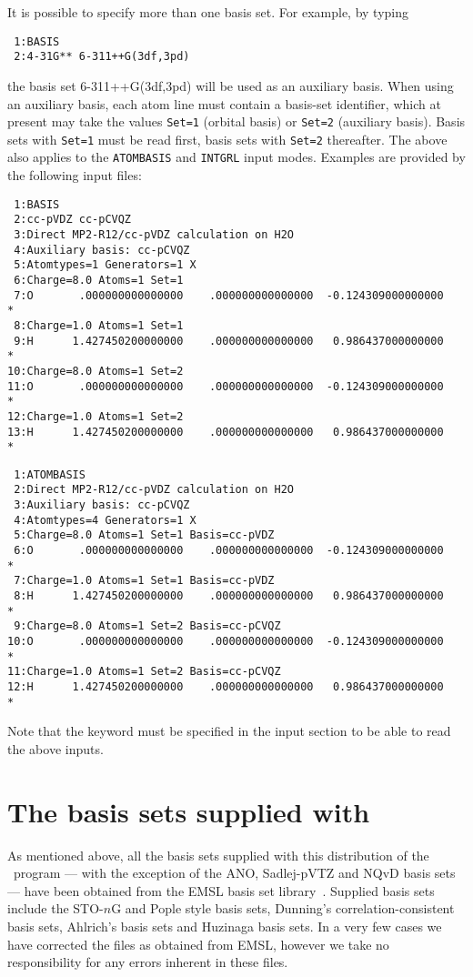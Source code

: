 It is possible to specify more than one basis set. For example, by typing
\begin{verbatim}
 1:BASIS
 2:4-31G** 6-311++G(3df,3pd)
\end{verbatim}
the basis set 6-311++G(3df,3pd) will be used as an auxiliary basis.
When using an auxiliary basis, each atom line must contain a basis-set
identifier, which at present may take the values \verb|Set=1| (orbital basis) or 
\verb|Set=2| (auxiliary basis). Basis sets with \verb|Set=1| must be read first,
basis sets with \verb|Set=2| thereafter.
The above also applies to the \verb|ATOMBASIS| and \verb|INTGRL| input modes.
Examples are provided by the following input files:
\begin{verbatim}
 1:BASIS
 2:cc-pVDZ cc-pCVQZ
 3:Direct MP2-R12/cc-pVDZ calculation on H2O
 4:Auxiliary basis: cc-pCVQZ
 5:Atomtypes=1 Generators=1 X
 6:Charge=8.0 Atoms=1 Set=1
 7:O       .000000000000000    .000000000000000  -0.124309000000000       *
 8:Charge=1.0 Atoms=1 Set=1
 9:H      1.427450200000000    .000000000000000   0.986437000000000       *
10:Charge=8.0 Atoms=1 Set=2
11:O       .000000000000000    .000000000000000  -0.124309000000000       *
12:Charge=1.0 Atoms=1 Set=2
13:H      1.427450200000000    .000000000000000   0.986437000000000       *
\end{verbatim}
\begin{verbatim}
 1:ATOMBASIS
 2:Direct MP2-R12/cc-pVDZ calculation on H2O
 3:Auxiliary basis: cc-pCVQZ
 4:Atomtypes=4 Generators=1 X
 5:Charge=8.0 Atoms=1 Set=1 Basis=cc-pVDZ
 6:O       .000000000000000    .000000000000000  -0.124309000000000       *
 7:Charge=1.0 Atoms=1 Set=1 Basis=cc-pVDZ
 8:H      1.427450200000000    .000000000000000   0.986437000000000       *
 9:Charge=8.0 Atoms=1 Set=2 Basis=cc-pCVQZ
10:O       .000000000000000    .000000000000000  -0.124309000000000       *
11:Charge=1.0 Atoms=1 Set=2 Basis=cc-pCVQZ
12:H      1.427450200000000    .000000000000000   0.986437000000000       *
\end{verbatim}
Note that the keyword  must be specified in the 
 input section to be able to read the above inputs.

\section{The basis sets supplied with \dalton }
\label{sec:basislist}

As mentioned above, all the basis sets supplied with this distribution
of the \dalton\ program --- with the exception of the ANO, 
Sadlej-pVTZ 
and NQvD basis sets --- have been obtained 
from the EMSL basis set library~\cite{emslref}. 
Supplied basis sets include the STO-$n$G and Pople style basis sets,
Dunning's correlation-consistent basis 
sets, 
Ahlrich's basis sets and Huzinaga basis sets. 
In a very few cases we have corrected the
files as obtained from EMSL, however we take no responsibility
for any errors inherent in these files.

